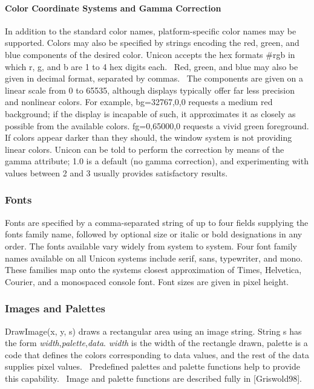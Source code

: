 \paragraph{Color Coordinate Systems and Gamma Correction}
In addition to the standard color names, platform-specific color names
may be supported. Colors may also be specified by strings encoding the
red, green, and blue components of the desired color. Unicon accepts
the hex formats {\textquotedbl}\#rgb{\textquotedbl} in which r, g, and
b are 1 to 4 hex digits each. \ Red, green, and blue may also be given
in decimal format, separated by commas. \ The components are given on a
linear scale from 0 to 65535, although displays typically offer far
less precision and nonlinear colors. For example,
{\textquotedbl}bg=32767,0,0{\textquotedbl} requests a medium red
background; if the display is incapable of such, it approximates it as
closely as possible from the available colors.
{\textquotedbl}fg=0,65000,0{\textquotedbl} requests a vivid green
foreground. If colors appear darker than they should, the window system
is not providing linear colors. Unicon can be told to perform the
correction by means of the gamma attribute; 1.0 is a default (no gamma
correction), and experimenting with values between 2 and 3 usually
provides satisfactory results.

\subsubsection{Fonts}

Fonts are specified by a comma-separated string of up to four fields
supplying the font{\textquotesingle}s family name, followed by optional
size or italic or bold designations in any order. The fonts available
vary widely from system to system. Four font family names available on
all Unicon systems include serif, sans, typewriter, and mono. These
families map onto the system{\textquotesingle}s closest approximation
of Times, Helvetica, Courier, and a monospaced console font. Font sizes
are given in pixel height.

\subsubsection{Images and Palettes}

DrawImage(x, y, s) draws a rectangular area using an image string.
String s has the form
{\textquotedbl}\textit{width},\textit{palette},\textit{data}{\textquotedbl}.
\textit{width} is the width of the rectangle drawn, palette is a code
that defines the colors corresponding to data values, and the rest of
the data supplies pixel values. \ Predefined palettes and palette
functions help to provide this capability. \ Image and palette
functions are described fully in [Griswold98].

